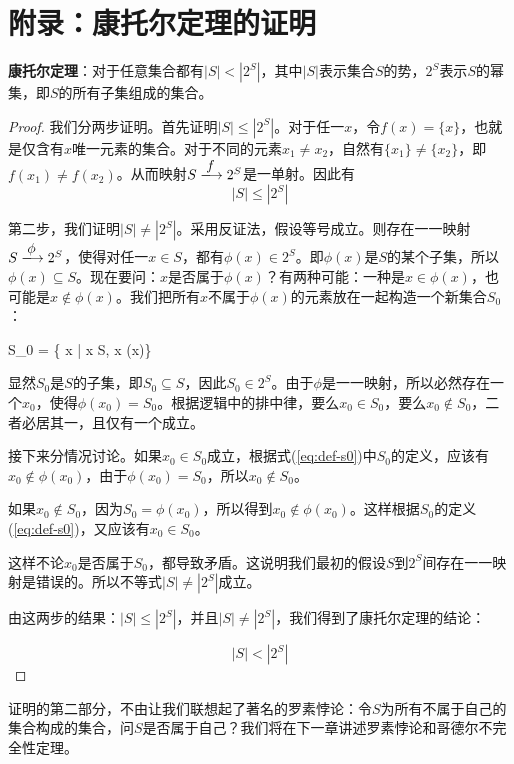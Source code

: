 \documentclass{article}
\begin{document}
\section{附录：康托尔定理的证明}

\begin{theorem}
\textbf{康托尔定理}：对于任意集合都有$|S| < |2^S|$，其中$|S|$表示集合$S$的势，$2^S$表示$S$的幂集，即$S$的所有子集组成的集合。
\end{theorem}

\begin{proof}
我们分两步证明。首先证明$|S| \leq |2^S|$。对于任一$x$，令$f(x) = \{x\}$，也就是仅含有$x$唯一元素的集合。对于不同的元素$x_1 \neq x_2$，自然有$\{x_1\} \neq \{x_2\}$，即$f(x_1) \neq f(x_2)$。从而映射$S \arrowto{f} 2^S$是一单射。因此有
\[
  |S| \leq |2^S|
\]

第二步，我们证明$|S| \neq |2^S|$。采用反证法，假设等号成立。则存在一一映射$S \arrowto{\phi} 2^S$，使得对任一$x \in S$，都有$\phi(x) \in 2^S$。即$\phi(x)$是$S$的某个子集，所以$\phi(x) \subseteq S$。现在要问：$x$是否属于$\phi(x)$？有两种可能：一种是$x \in \phi(x)$，也可能是$x \notin \phi(x)$。我们把所有$x$不属于$\phi(x)$的元素放在一起构造一个新集合$S_0$：

\be
S_0 = \{ x | x \in S,  x \notin \phi(x)\}
\label{eq:def-s0}
\ee

显然$S_0$是$S$的子集，即$S_0 \subseteq S$，因此$S_0 \in 2^S$。由于$\phi$是一一映射，所以必然存在一个$x_0$，使得$\phi(x_0) = S_0$。根据逻辑中的排中律，要么$x_0 \in S_0$，要么$x_0 \notin S_0$，二者必居其一，且仅有一个成立。

接下来分情况讨论。如果$x_0 \in S_0$成立，根据式(\ref{eq:def-s0})中$S_0$的定义，应该有$x_0 \notin \phi(x_0)$，由于$\phi(x_0) = S_0$，所以$x_0 \notin S_0$。

如果$x_0 \notin S_0$，因为$S_0 = \phi(x_0)$，所以得到$x_0 \notin \phi(x_0)$。这样根据$S_0$的定义(\ref{eq:def-s0})，又应该有$x_0 \in S_0$。

这样不论$x_0$是否属于$S_0$，都导致矛盾。这说明我们最初的假设$S$到$2^S$间存在一一映射是错误的。所以不等式$|S| \neq |2^S|$成立。

由这两步的结果：$|S| \leq |2^S|$，并且$|S| \neq |2^S|$，我们得到了康托尔定理的结论：

\[
  |S| < |2^S|
\]
\end{proof}

证明的第二部分，不由让我们联想起了著名的罗素悖论：令$S$为所有不属于自己的集合构成的集合，问$S$是否属于自己？我们将在下一章讲述罗素悖论和哥德尔不完全性定理。
\end{document}
